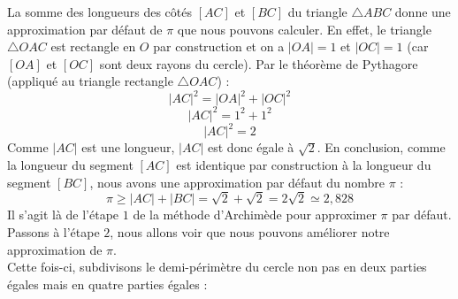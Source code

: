 \documentclass[a4paper,fontsize=13pt]{scrreprt}
\theoremstyle{plain}
\theoremstyle{definition}
\begin{document}
\begin{center}
\end{center}
La somme des longueurs des côtés $[AC]$ et $[BC]$ du triangle $\triangle ABC$ donne une approximation par défaut de $\pi$ que nous pouvons calculer. En effet, le triangle $\triangle OAC$ est rectangle en $O$ par construction et on a $|OA| = 1$ et $|OC| = 1$ (car $[OA]$ et $[OC]$ sont deux rayons du cercle). Par le théorème de Pythagore (appliqué au triangle rectangle $\triangle OAC$) :
$${|AC|}^2 = {|OA|}^2 + {|OC|}^2$$
$${|AC|}^2 = 1^2 + 1^2$$
$${|AC|}^2 = 2$$
Comme $|AC|$ est une longueur, $|AC|$ est donc égale à $\sqrt{2}$. En conclusion, comme la longueur du segment $[AC]$ est identique par construction à la longueur du segment $[BC]$, nous avons une approximation par défaut du nombre $\pi$ :
$$\pi \ge |AC| + |BC| = \sqrt{2}+\sqrt{2}=2\sqrt{2} \simeq 2,828$$
Il s'agit là de l'étape $1$ de la méthode d'Archimède pour approximer $\pi$ par défaut. Passons à l'étape $2$, nous allons voir que nous pouvons améliorer notre approximation de $\pi$. \\
Cette fois-ci, subdivisons le demi-périmètre du cercle non pas en deux parties égales mais en quatre parties égales :
\begin{center}
\end{center}
\end{document}
